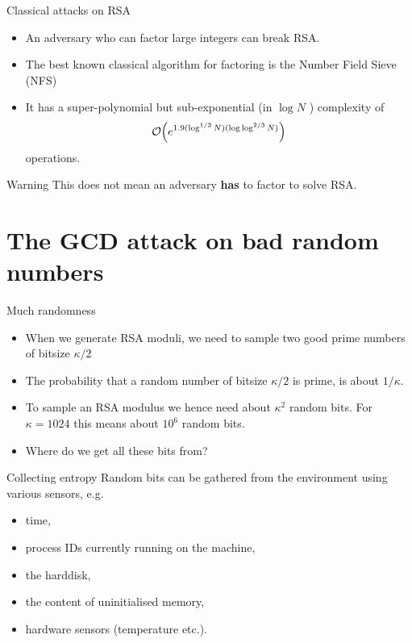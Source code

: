 \documentclass[presentation,smaller]{beamer}
\begin{document}
\begin{frame}[label={sec:orgheadline9}]{Classical attacks on RSA}
\begin{itemize}
\item An adversary who can factor large integers can break RSA.

\item The best known classical algorithm for factoring is the Number Field Sieve (NFS)

\item It has a \alert{super-polynomial} but \alert{sub-exponential} (in \(\log N\) ) complexity of \[\bigO{e^{1.9 (\log^{1/3} N) (\log\log^{2/3} N)}}\] operations.
\end{itemize}


\pause

\begin{block}{Warning}
This does not mean an adversary \textbf{has} to factor to solve RSA.
\end{block}
\end{frame}

\section{The GCD attack on bad random numbers}
\label{sec:orgheadline18}
\begin{frame}[label={sec:orgheadline11}]{Much randomness}
\begin{itemize}
\item When we generate RSA moduli, we need to sample two good prime numbers of bitsize \(κ/2\)
\item The probability that a random number of bitsize \(κ/2\) is prime, is about \(1/κ\).
\item To sample an RSA modulus we hence need about \(κ^2\) random bits. For \(κ = 1024\) this means about \(10^6\) random bits.
\item Where do we get all these bits from?
\end{itemize}
\end{frame}

\begin{frame}[label={sec:orgheadline12}]{Collecting entropy}
Random bits can be gathered from the environment using various sensors, e.g.

\begin{itemize}
\item time,
\item process IDs currently running on the machine,
\item the harddisk,
\item the content of uninitialised memory,
\item hardware sensors (temperature etc.).
\end{itemize}
\end{frame}
\end{document}
